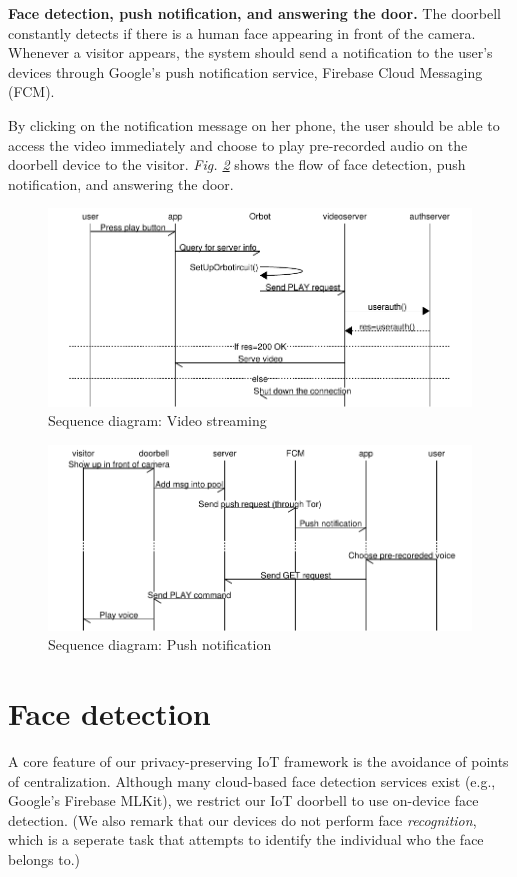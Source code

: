 \textbf{Face detection, push notification, and answering the door.} The doorbell constantly detects if there is a human face appearing in front of the camera. Whenever a visitor appears, the system should send a notification to the user's devices through Google's push notification service, Firebase Cloud Messaging (FCM).

By clicking on the notification message on her phone, the user should be able to access the video immediately and choose to play pre-recorded audio on the doorbell device to the visitor.
\textit{Fig. \ref{fig:push}} shows the flow of face detection, push notification, and answering the door.


\begin{figure}
	\includegraphics[width=\linewidth]{Sequence_diagram_playvideo.pdf}
	\caption{Sequence diagram: Video streaming}
	\label{fig:playvideo}
\end{figure}
\begin{figure}
	\includegraphics[width=\linewidth]{Sequence_diagram_push.pdf}
	\caption{Sequence diagram: Push notification}
	\label{fig:push}
\end{figure}


\section{Face detection}
A core feature of our privacy-preserving IoT framework is the avoidance of points of centralization. Although many cloud-based face detection services exist (e.g., Google's Firebase MLKit), we restrict our IoT doorbell to use on-device face detection. (We also remark that our devices do not perform face \textit{recognition}, which is a seperate task that attempts to identify the individual who the face belongs to.) 

